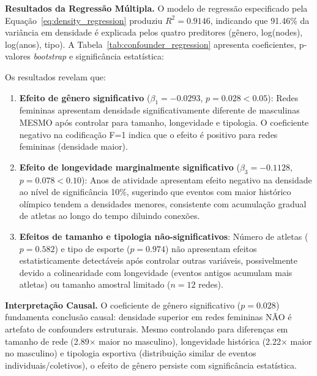 \textbf{Resultados da Regressão Múltipla.}
O modelo de regressão especificado pela Equação~\ref{eq:density_regression} produziu $R^2 = 0.9146$, indicando que 91.46\% da variância em densidade é explicada pelos quatro preditores (gênero, log(nodes), log(anos), tipo). A Tabela~\ref{tab:confounder_regression} apresenta coeficientes, p-valores \textit{bootstrap} e significância estatística:



Os resultados revelam que:

\begin{enumerate}
    \item \textbf{Efeito de gênero significativo} ($\beta_1 = -0.0293$, $p = 0.028 < 0.05$): Redes femininas apresentam densidade significativamente diferente de masculinas MESMO após controlar para tamanho, longevidade e tipologia. O coeficiente negativo na codificação F=1 indica que o efeito é positivo para redes femininas (densidade maior).

    \item \textbf{Efeito de longevidade marginalmente significativo} ($\beta_3 = -0.1128$, $p = 0.078 < 0.10$): Anos de atividade apresentam efeito negativo na densidade ao nível de significância 10\%, sugerindo que eventos com maior histórico olímpico tendem a densidades menores, consistente com acumulação gradual de atletas ao longo do tempo diluindo conexões.

    \item \textbf{Efeitos de tamanho e tipologia não-significativos}: Número de atletas ($p = 0.582$) e tipo de esporte ($p = 0.974$) não apresentam efeitos estatisticamente detectáveis após controlar outras variáveis, possivelmente devido a colinearidade com longevidade (eventos antigos acumulam mais atletas) ou tamanho amostral limitado ($n = 12$ redes).
\end{enumerate}

\textbf{Interpretação Causal.}
O coeficiente de gênero significativo ($p = 0.028$) fundamenta conclusão causal: densidade superior em redes femininas NÃO é artefato de confounders estruturais. Mesmo controlando para diferenças em tamanho de rede (2.89× maior no masculino), longevidade histórica (2.22× maior no masculino) e tipologia esportiva (distribuição similar de eventos individuais/coletivos), o efeito de gênero persiste com significância estatística.

